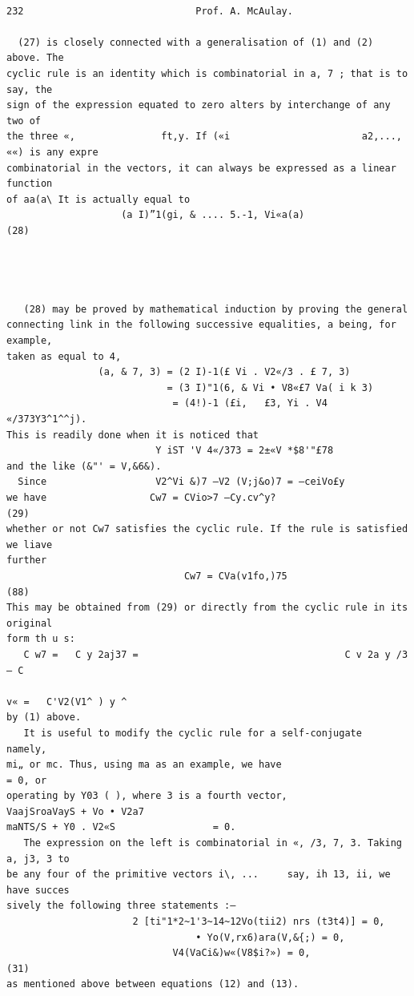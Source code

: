 \documentclass[10pt]{article}
\begin{document}
\clearpage
\begin{verbatim}

232                              Prof. A. McAulay.

  (27) is closely connected with a generalisation of (1) and (2) above. The
cyclic rule is an identity which is combinatorial in a, 7 ; that is to say, the
sign of the expression equated to zero alters by interchange of any two of
the three «,               ft,y. If («i                       a2,..., ««) is any expre
combinatorial in the vectors, it can always be expressed as a linear function
of aa(a\ It is actually equal to
                    (a I)”1(gi, & .... 5.-1, Vi«a(a)                     (28)




   (28) may be proved by mathematical induction by proving the general
connecting link in the following successive equalities, a being, for example,
taken as equal to 4,
                (a, & 7, 3) = (2 I)-1(£ Vi . V2«/3 . £ 7, 3)
                            = (3 I)"1(6, & Vi • V8«£7 Va( i k 3)
                             = (4!)-1 (£i,   £3, Yi . V4 «/373Y3^1^^j).
This is readily done when it is noticed that
                          Y iST 'V 4«/373 = 2±«V *$8'"£78
and the like (&"' = V,&6&).
  Since                   V2^Vi &)7 —V2 (V;j&o)7 = —ceiVo£y
we have                  Cw7 = CVio>7 —Cy.cv^y?                            (29)
whether or not Cw7 satisfies the cyclic rule. If the rule is satisfied we liave
further
                               Cw7 = CVa(v1fo,)75                          (88)
This may be obtained from (29) or directly from the cyclic rule in its original
form th u s:
   C w7 =   C y 2aj37 =                                    C v 2a y /3 — C
                                                                         v« =   C'V2(V1^ ) y ^
by (1) above.
   It is useful to modify the cyclic rule for a self-conjugate          namely,
mi„ or mc. Thus, using ma as an example, we have                              = 0, or
operating by Y03 ( ), where 3 is a fourth vector,
VaajSroaVayS + Vo • V2a7                                                                                                      maNTS/S + Y0 . V2«S                 = 0.
   The expression on the left is combinatorial in «, /3, 7, 3. Taking a, j3, 3 to
be any four of the primitive vectors i\, ...     say, ih 13, ii, we have succes­
sively the following three statements :—
                      2 [ti"1*2~1'3~14~12Vo(tii2) nrs (t3t4)] = 0,
                                 • Yo(V,rx6)ara(V,&{;) = 0,
                             V4(VaCi&)w«(V8$i?») = 0,                                  (31)
as mentioned above between equations (12) and (13).


\end{verbatim}
\end{document}
